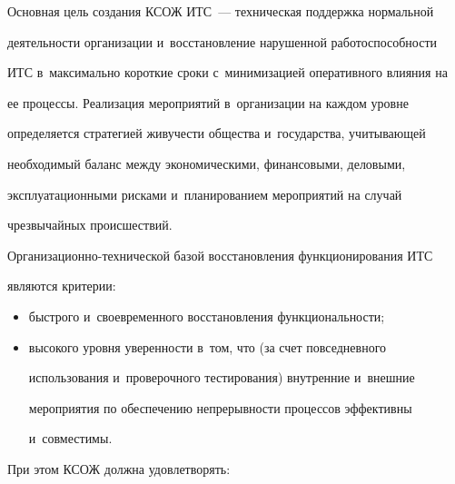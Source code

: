   Основная цель создания КСОЖ ИТС~--- техническая поддержка нормальной 


деятельности организации и~восстановление нарушенной работоспособности 


ИТС в~максимально короткие сроки с~минимизацией оперативного влияния на 


ее процессы. Реализация мероприятий в~организации на каждом уровне 


определяется стратегией живучести общества и~государства, учитывающей 


необходимый баланс между экономическими, финансовыми, деловыми, 


эксплуатационными рисками и~планированием мероприятий на случай 


чрезвычайных происшествий.


{





}


  


  Организационно-технической базой восстановления функционирования ИТС 


являются критерии:


  \begin{itemize}


  \item быстрого и~своевременного восстановления функциональности;


  \item высокого уровня уверенности в~том, что (за счет повседневного 


использования и~проверочного тестирования) внутренние и~внешние 


мероприятия по обеспечению непрерывности процессов эффективны 


и~совместимы.


  \end{itemize}


  


  При этом КСОЖ должна удовлетворять:


